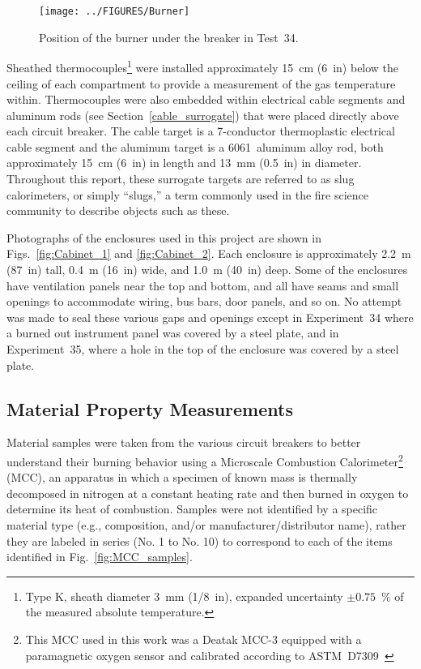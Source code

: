 \begin{figure}[ht]
\centering
\texttt{[image: ../FIGURES/Burner]}
\caption[Position of the burner] {Position of the burner under the breaker in Test~34.}
\label{fig:Burner}
\end{figure}

Sheathed thermocouples\footnote{Type K, sheath diameter 3~mm (1/8~in), expanded uncertainty $\pm 0.75$~\% of the measured absolute temperature.} were installed approximately 15~cm (6~in) below the ceiling of each compartment to provide a measurement of the gas temperature within. Thermocouples were also embedded within electrical cable segments and aluminum rods (see Section~\ref{cable_surrogate}) that were placed directly above each circuit breaker. The cable target is a 7-conductor thermoplastic electrical cable segment and the aluminum target is a 6061~aluminum alloy rod, both approximately  15~cm (6~in) in length and 13~mm (0.5~in) in diameter. Throughout this report, these surrogate targets are referred to as slug calorimeters, or simply ``slugs,'' a term commonly used in the fire science community to describe objects such as these.

Photographs of the enclosures used in this project are shown in Figs.~\ref{fig:Cabinet_1} and \ref{fig:Cabinet_2}. Each enclosure is approximately 2.2~m (87~in) tall, 0.4~m (16~in) wide, and 1.0~m (40~in) deep. Some of the enclosures have ventilation panels near the top and bottom, and all have seams and small openings to accommodate wiring, bus bars, door panels, and so on. No attempt was made to seal these various gaps and openings except in Experiment~34 where a burned out instrument panel was covered by a steel plate, and in Experiment~35, where a hole in the top of the enclosure was covered by a steel plate.

\subsection{Material Property Measurements}
\label{ssec:MCC}

Material samples were taken from the various circuit breakers to better understand their burning behavior using a Microscale Combustion Calorimeter\footnote{This MCC used in this work was a Deatak MCC-3 equipped with a paramagnetic oxygen sensor and calibrated according to ASTM~D7309~\cite{ASTMD7309}} (MCC), an apparatus in which a specimen of known mass is thermally decomposed in nitrogen at a constant heating rate and then burned in oxygen to determine its heat of combustion. Samples were not identified by a specific material type (e.g., composition, and/or manufacturer/distributor name), rather they are labeled in series (No. 1 to No. 10) to correspond to each of the items identified in Fig.~\ref{fig:MCC_samples}.


